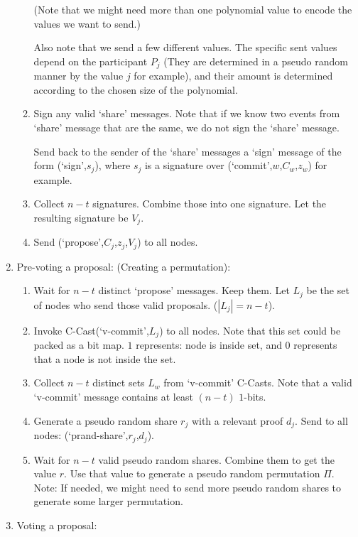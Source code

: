 \begin{enumerate}
\begin{enumerate}
      (Note that we might need more than one polynomial value to encode the
      values we want to send.)

      Also note that we send a few different values. The specific sent
      values depend on the participant $P_j$ (They are determined in a pseudo
      random manner by the value $j$ for example), and their amount is
      determined according to the chosen size of the polynomial.

    \item Sign any valid `share' messages. Note that if we know two events from
      `share' message that are the same, we do not sign the `share' message.

      Send back to the sender of the `share' messages a `sign' message of the
      form (`sign',$s_j$), where $s_j$ is a signature over
      (`commit',$w$,$C_w$,$z_w$) for example.
    \item Collect $n-t$ signatures. Combine those into one signature. Let the
      resulting signature be $V_j$.
    \item Send (`propose',$C_j$,$z_j$,$V_j$) to all nodes.
  \end{enumerate}
  \item Pre-voting a proposal: (Creating a permutation):
  \begin{enumerate}
    \item Wait for $n-t$ distinct `propose' messages. Keep them. Let $L_j$ be
      the set of nodes who send those valid proposals. ($|L_j| = n-t$).
    \item Invoke C-Cast(`v-commit',$L_j$) to all nodes. Note that this set could
      be packed as a bit map. $1$ represents: node is inside set, and $0$
      represents that a node is not inside the set.
    \item Collect $n-t$ distinct sets $L_w$ from `v-commit' C-Casts. Note that a
      valid `v-commit' message contains at least $(n-t)$ $1$-bits.
    \item Generate a pseudo random share $r_j$ with a relevant proof $d_j$. Send
      to all nodes: (`prand-share',$r_j$,$d_j$).
    \item Wait for $n-t$ valid pseudo random shares. Combine them to get the
      value $r$. Use that value to generate a pseudo random permutation $\Pi$.
      Note: If needed, we might need to send more pseudo random shares to
      generate some larger permutation.
  \end{enumerate}
  \item Voting a proposal:
  \begin{enumerate}

\end{enumerate}
\end{enumerate}

